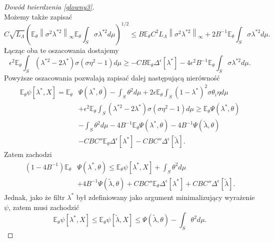 \documentclass[man,mfiu]{mgrwms}
\newcommand{\norm}[1]{\left\lVert#1\right\rVert}
\begin{document}
\begin{proof}[Dowód twierdzenia \ref{glowny3}]
\begin{displaymath}
\end{displaymath}
Możemy także zapisać
\begin{displaymath}
C\sqrt{L_{\Lambda}}\left(\mathbb{E}_{\theta}\norm{\sigma^2\lambda^{*2}}_{\infty}\mathbb{E}_{\theta}\int_S\sigma\lambda^{*2}d\mu\right)^{1/2}
\leq B\mathbb{E}_{\theta}C^2L_{\Lambda}\norm{\sigma^2\lambda^{*2}}_{\infty}+2B^{-1}\mathbb{E}_{\theta}\int_S\sigma\lambda^{*2}d\mu.
\end{displaymath}
Łącząc oba te oszacowania dostajemy
\begin{displaymath}
\epsilon^2\mathbb{E}_{\theta}\int_S(\lambda^{*2}-2\lambda^*)\sigma(\sigma\eta^2-1)d\mu\geq
-CB\mathbb{E}_{\theta}\Delta^{\epsilon}[\lambda^*]-4\epsilon^2B^{-1}\mathbb{E}_{\theta}\int_S\sigma\lambda^{*2}d\mu.
\end{displaymath}
Powyższe oszacowania pozwalają zapisać dalej następującą nierówność
\begin{displaymath}
\begin{split}
\mathbb{E}_{\theta}\psi[\lambda^*,X]=\mathbb{E}_{\theta}&\Psi(\lambda^*,\theta)-\int_S\theta ^2d\mu+2\epsilon\mathbb{E}_{\theta}\int_S(1-\lambda^*)^2\sigma \theta_i \eta d\mu\\
&+\epsilon^2\mathbb{E}_{\theta}\int_S(\lambda^{*2}-2\lambda^*)\sigma(\sigma\eta^2-1)d\mu \geq \mathbb{E}_{\theta}\Psi(\lambda^*,\theta)\\
&-\int_S\theta ^2d\mu-4B^{-1}\mathbb{E}_{\theta}\Psi(\lambda^*,\theta)-4B^{-1}\Psi(\tilde{\lambda},\theta)\\
&-CBC''\mathbb{E}_{\theta}\Delta^{\epsilon}[\lambda^*]-CBC''\Delta^{\epsilon}[\tilde{\lambda}].
\end{split}
\end{displaymath}
Zatem zachodzi
\begin{displaymath}
\begin{split}
(1-4B^{-1})\mathbb{E}_{\theta}&\Psi(\lambda^*,\theta)\leq \mathbb{E}_{\theta}\psi[\lambda^*,X]+\int_S\theta^2d\mu\\
&+4B^{-1}\Psi(\tilde{\lambda},\theta)+CBC''\mathbb{E}_{\theta}\Delta^{\epsilon}[\lambda^*]+CBC''\Delta^{\epsilon}[\tilde{\lambda}].
\end{split}
\end{displaymath}
Jednak, jako że filtr $\lambda^*$ był zdefiniowany jako argument minimalizujący wyrażenie $\psi$, zatem musi zachodzić
\begin{displaymath}
\mathbb{E}_{\theta}\psi[\lambda^*,X]\leq \mathbb{E}_{\theta}\psi[\tilde{\lambda},X]\leq \Psi(\tilde{\lambda},\theta)-\int_S\theta ^2d\mu.

\end{displaymath}
\end{proof}
\end{document}
